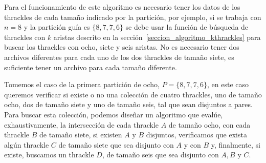   \begin{algorithm}
    \LinesNumbered
    \setcounter{AlgoLine}{35}
  \end{algorithm}

  Para el funcionamiento de este algoritmo es necesario tener los datos de los thrackles de cada
  tamaño indicado por la partición, por ejemplo, si se trabaja con $n=8$ y la partición guía es
  $\{8,7,7,6\}$ se debe usar la función de búsqueda de thrackles con $k$ aristas descrito en
  la sección~\ref{seccion_algoritmo_kthrackles} para buscar los thrackles con ocho, siete y seis
  aristas. No es necesario tener dos archivos diferentes para cada uno de los dos thrackles de
  tamaño siete, es suficiente tener un archivo para cada tamaño diferente.

  Tomemos el caso de la primera partición de ocho, $P=\{8,7,7,6\}$, en este caso queremos
  verificar si existe o no una colección de cuatro thrackles, uno de tamaño ocho, dos de
  tamaño siete y uno de tamaño seis, tal que sean disjuntos a pares. Para buscar esta colección,
  podemos diseñar un algoritmo que evalúe, exhaustivamente, la intersección de cada
  thrackle $A$ de tamaño ocho, con cada thrackle $B$ de tamaño siete, si existen $A$ y $B$
  disjuntos, verificamos que exista algún thrackle $C$ de tamaño siete que sea disjunto con
  $A$ y con $B$ y, finalmente, si existe, buscamos un thrackle $D$, de tamaño seis que sea
  disjunto con $A,B$ y $C$.

